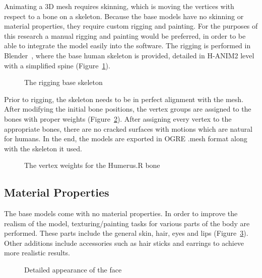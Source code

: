 Animating a 3D mesh requires skinning, which is moving the vertices with respect to a bone on a skeleton. Because the base models have no skinning or material properties, they require custom rigging and painting. For the purposes of this research a manual rigging and painting would be preferred, in order to be able to integrate the model easily into the software. The rigging is performed in Blender~\cite{Blender}, where the base human skeleton is provided, detailed in H-ANIM2 level with a simplified spine (Figure~\ref{fig:rigging_skeleton}). 

\begin{figure}[h]
\centerline{}
\caption{The rigging base skeleton}
\label{fig:rigging_skeleton}
\end{figure}

Prior to rigging, the skeleton needs to be in perfect alignment with the mesh. After modifying the initial bone positions, the vertex groups are assigned to the bones with proper weights (Figure~\ref{fig:weight_humerus_r}).
After assigning every vertex to the appropriate bones, there are no cracked surfaces with motions which are natural for humans. In the end, the models are exported in OGRE .mesh format along with the skeleton it used.

\begin{figure}[h]
\centerline{}
\caption{The vertex weights for the Humerus.R bone}
\label{fig:weight_humerus_r}
\end{figure}

\subsection{Material Properties}

The base models come with no material properties. In order to improve the realism of the model, texturing/painting tasks for various parts of the body are performed. These parts include the general skin, hair, eyes and lips (Figure~\ref{fig:detailed_face}). Other additions include accessories such as hair sticks and earrings to achieve more realistic results.

\begin{figure}[h]
\centerline{}
\caption{Detailed appearance of the face}
\label{fig:detailed_face}
\end{figure}

